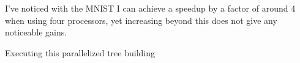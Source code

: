 \documentclass[12pt]{article}
\begin{document}
I've noticed with the MNIST I can achieve a speedup by a factor of around 4
when using four processors, yet increasing beyond this does not give any
noticeable gains.

Executing this parallelized tree building 


%
%
%







\end{document}
